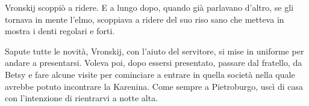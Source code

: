 Vronskij scoppiò a ridere. E a lungo dopo, quando già parlavano d'altro, se gli tornava in mente l'elmo, scoppiava a ridere del suo riso sano che metteva in mostra i denti regolari e forti. 

Sapute tutte le novità, Vronskij, con l'aiuto del servitore, si mise in uniforme per andare a presentarsi. Voleva poi, dopo essersi presentato, passare dal fratello, da Betsy e fare alcune visite per cominciare a entrare in quella società nella quale avrebbe potuto incontrare la Karenina. Come sempre a Pietroburgo, uscì di casa con l'intenzione di rientrarvi a notte alta. 
